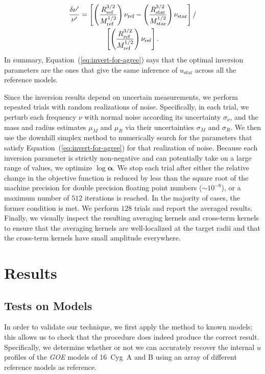 \else
\begin{gather}
    \frac{\delta \nu'}{\nu'}
    =
    \left[
        \left(
            \frac{R_{\text{ref}}^{3/2}}{M_{\text{ref}}^{1/2}}
        \right) 
        \nu_{\text{ref}}
        -
        \left(
            \frac{R_{\text{star}}^{3/2}}{M_{\text{star}}^{1/2}}
        \right)
        \nu_{\text{star}}
    \right]
    / \notag \\
    \left[
        \left(
            \frac{R_{\text{ref}}^{3/2}}{M_{\text{ref}}^{1/2}}
        \right)
        \nu_{\text{ref}}
    \right]. 
\end{gather} 
\fi
In summary, Equation~(\ref{eq:invert-for-agree}) says that the optimal inversion parameters are the ones that give the same inference of $u_{\text{star}}$ across all the reference models. 


Since the inversion results depend on uncertain measurements, we perform repeated trials with random realizations of noise. 
Specifically, in each trial, we perturb each frequency $\nu$ with normal noise according its uncertainty $\sigma_{\nu}$, and the mass and radius estimates $\mu_M$ and $\mu_R$ via their uncertainties $\sigma_M$ and $\sigma_R$. 
We then use the %
downhill simplex method to numerically search for the parameters that satisfy Equation~(\ref{eq:invert-for-agree}) for that realization of noise. 
Because each inversion parameter is strictly non-negative and can potentially take on a large range of values, we optimize $\log \boldsymbol \alpha$. 
We stop each trial after either the relative change in the objective function is reduced by less than the square root of the machine precision for double precision floating point numbers (${\sim 10^{-8}}$), or a maximum number of $512$ iterations is reached. 
In the majority of cases, the former condition is met. 
We perform $128$ trials and report the averaged results. 
Finally, we visually inspect the resulting averaging kernels and cross-term kernels to ensure that the averaging kernels are well-localized at the target radii and that the cross-term kernels have small amplitude everywhere. 




{}
\section{Results} 
\subsection{Tests on Models} 
In order to validate our technique, we first apply the method to known models; this allows us to check that the procedure does indeed produce the correct result.
Specifically, we determine whether or not we can accurately recover the internal $u$ profiles of the \emph{GOE} models of 16~Cyg~A and B using an array of different reference models as reference.

